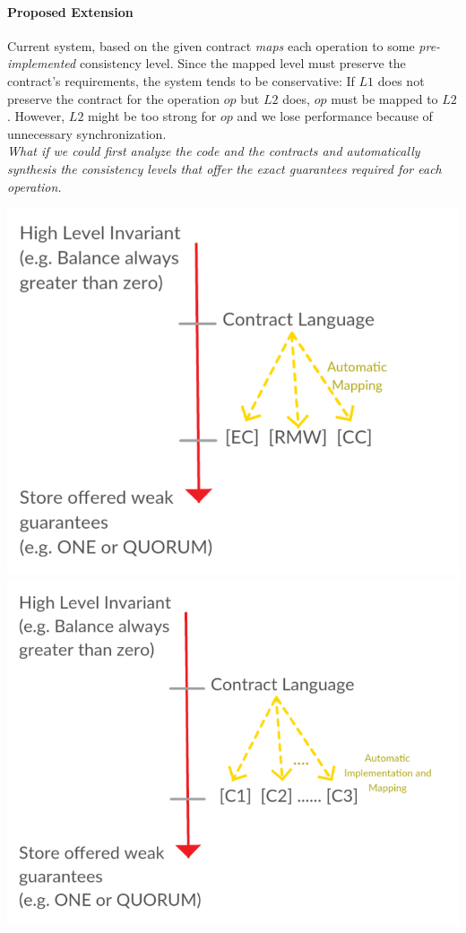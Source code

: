 \documentclass[runningheads]{llncs}
\begin{document}
\paragraph {\bf Proposed Extension}
Current system, based on the given contract \emph{maps} each operation to some \emph{pre-implemented} consistency level. Since the mapped level must preserve the contract's requirements, the system tends to be conservative: If $L1$ does not preserve the contract for the operation $op$ but $L2$ does, $op$ must be mapped to $L2$. However, $L2$ might be too strong for $op$ and we lose performance because of unnecessary synchronization. \\ \emph{ What if we could first analyze the code and the contracts and automatically synthesis the consistency levels that offer the exact guarantees required for each operation. }
\begin{center}
\includegraphics[scale=0.43]{Gap3.pdf} \hspace{7mm}
\includegraphics[scale=0.43]{Gap5.pdf}
\end{center}
\end{document}
